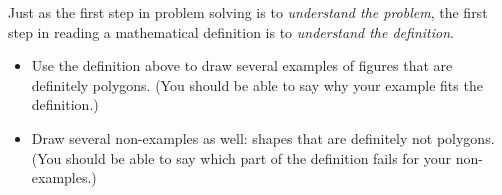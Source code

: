 \bigskip

\begin{thinkpair*}
Just as the first step in problem solving is to \emph{understand the problem}, the first step in reading a mathematical definition is to \emph{understand the definition}.   
\begin{itemize}
\item
Use the definition above to draw several examples of figures that are definitely polygons.  (You should be able to say why your example fits the definition.)\\
\item
Draw several non-examples as well: shapes that are definitely not polygons.  (You should be able to say which part of the definition fails for your non-examples.)\\

\end{itemize}
\end{thinkpair*}



\newpage




